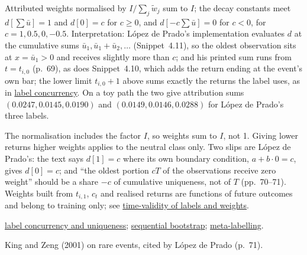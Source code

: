 \begin{qfmethod}
 Attributed weights normalised by $I/\sum_j\tilde w_j$ sum to $I$; the decay constants meet $d[\sum\bar u]=1$ and $d[0]=c$ for $c\ge0$, and $d[-c\sum\bar u]=0$ for $c<0$, for $c=1,0.5,0,-0.5$. Interpretation: López de Prado's implementation evaluates $d$ at the cumulative sums $\bar u_1,\bar u_1+\bar u_2,\dots$ (Snippet~4.11), so the oldest observation sits at $x=\bar u_1>0$ and receives slightly more than $c$; and his printed sum runs from $t=t_{i,0}$ (p.~69), as does Snippet~4.10, which adds the return ending at the event's own bar; the lower limit $t_{i,0}+1$ above sums exactly the returns the label uses, as in \hyperref[def:label-concurrency-uniqueness]{label concurrency}. On a toy path the two give attribution sums $(0.0247,0.0145,0.0190)$ and $(0.0149,0.0146,0.0288)$ for López de Prado's three labels.

 The normalisation includes the factor $I$, so weights sum to $I$, not 1. Giving lower returns higher weights applies to the neutral class only. Two slips are López de Prado's: the text says $d[1]=c$ where its own boundary condition, $a+b\cdot0=c$, gives $d[0]=c$; and ``the oldest portion $cT$ of the observations receive zero weight'' should be a share $-c$ of cumulative uniqueness, not of $T$ (pp.~70--71). Weights built from $t_{i,1}$, $c_t$ and realised returns are functions of future outcomes and belong to training only; see \hyperref[pit:label-weight-leakage]{time-validity of labels and weights}.

 \hyperref[def:label-concurrency-uniqueness]{label concurrency and uniqueness}; \hyperref[meth:sequential-bootstrap]{sequential bootstrap}; \hyperref[meth:meta-labelling]{meta-labelling}.

 King and Zeng (2001) on rare events, cited by López de Prado (p.~71).

\end{qfmethod}

